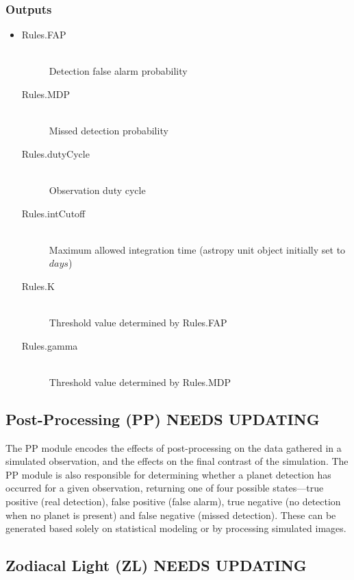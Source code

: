 \documentclass[cleanfoot]{asme2ej}
\begin{document}
\subsubsection*{Outputs}
\begin{itemize}
    \item
    \begin{description}
        \item[Rules.FAP] \hfill \\
        Detection false alarm probability
        \item[Rules.MDP] \hfill \\
        Missed detection probability
        \item[Rules.dutyCycle] \hfill \\
        Observation duty cycle
        \item[Rules.intCutoff] \hfill \\
        Maximum allowed integration time (astropy unit object initially set to $ days $)
        \item[Rules.K] \hfill \\
        Threshold value determined by Rules.FAP
        \item[Rules.gamma] \hfill \\
        Threshold value determined by Rules.MDP
    \end{description}
\end{itemize}


\subsection{Post-Processing (PP) NEEDS UPDATING}
The PP module encodes the effects of post-processing on the data gathered in a simulated observation, and the effects on the final contrast of the simulation.  The PP module is also responsible for determining whether a planet detection has occurred for a given observation, returning one of four possible states---true positive (real detection), false positive (false alarm), true negative (no detection when no planet is present) and false negative (missed detection).  These can be generated based solely on statistical modeling or by processing simulated images.
\label{sec:postprocessing}

\subsection{Zodiacal Light (ZL) NEEDS UPDATING}
\label{sec:zodiacallight}
\end{document}
